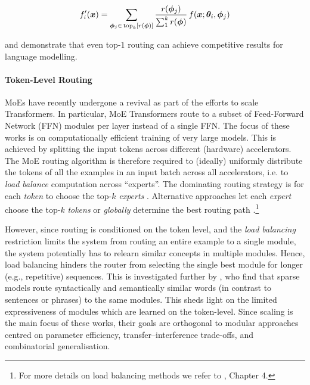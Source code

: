 \documentclass[10pt]{article} %
\begin{document}
\begin{equation}
    f_i^\prime({\bm{x}}) = \sum_{{\bm{\phi}}_j \in \, \text{top}_k[r(\bm{{\bm{\phi}}})]} \frac{r({\bm{\phi}}_j)}{\sum_1^k r({\bm{\phi}})} \, f({\bm{x}}; {\bm{\theta}}_i, {\bm{\phi}}_j)
\end{equation}
 
\citet{fedus2021switch} and \citet{Clark2022UnifiedScaling}  demonstrate that even top-$1$ routing can achieve competitive results for language modelling. 

\paragraph*{Token-Level Routing}
MoEs have recently undergone a revival as part of the efforts to scale Transformers. In particular, MoE Transformers route to a subset of Feed-Forward Network (FFN) modules per layer instead of a single FFN. The focus of these works is on computationally efficient training of very large models. This is achieved by splitting the input tokens across different (hardware) accelerators. The MoE routing algorithm is therefore required to (ideally) uniformly distribute the tokens of all the examples in an input batch across all accelerators, i.e. to \textit{load balance} computation across ``experts''. The dominating routing strategy is for each \textit{token} to choose the top-$k$ \textit{experts}  \citep{shazeer2017outrageously, Lepikhin2021GShard, fedus2021switch, Clark2022UnifiedScaling, yang2021m6, dua-etal-2022-tricks, hazimeh2021dselect, rajbhandari2022deepspeed, riquelme2021scaling, Du2022Glam, Zoph2022STMOE}. Alternative approaches let each \textit{expert} choose the top-$k$ \textit{tokens} \citep{you2022speechmoe2, Zhou2022MoEExpert} or \textit{globally} determine the best routing path  \citep{lewis2021base}.\footnote{For more details on load balancing methods we refer to \citet{fedus2022review}, Chapter 4.} 

However, since routing is conditioned on the token level,  
and the \textit{load balancing} restriction limits the system from routing an entire example to a single module,  
the system potentially has to relearn similar concepts in multiple modules. Hence, load balancing hinders the router from selecting the single best module for longer (e.g., repetitive) sequences. This is investigated further by \cite{lewis2021base}, who find  that sparse models  route syntactically and semantically similar {words} (in contrast to sentences or phrases)  to the same modules. This sheds light on the limited expressiveness of modules which are learned on the {token}-level. 
Since scaling is the main focus of these works, their goals are {orthogonal} to modular approaches centred on parameter efficiency, transfer--interference trade-offs, and combinatorial generalisation.
\end{document}
